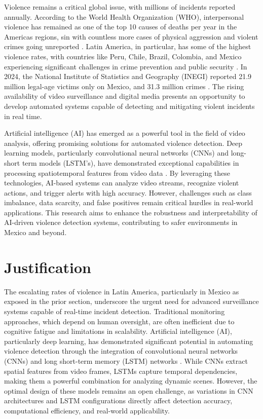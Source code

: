 


Violence remains a critical global issue, with millions of 
incidents reported annually. According to the World Health 
Organization (WHO), interpersonal violence has remained as one 
of the top 10 causes of deaths per year in the Americas regions, 
sin with countless more cases of physical aggression and violent 
crimes going unreported \cite{WorldHealthOrganization2024}. 
Latin America, in particular, has some of the highest violence rates, 
with countries like Peru, Chile, Brazil, Colombia, and Mexico experiencing 
significant challenges in crime prevention and public security 
\cite{Bisca2024}. In 2024, the National Institute of Statistics and 
Geography (INEGI) reported 21.9 million legal-age victims only on 
Mexico, and 31.3 million crimes \cite{INEGI2024}. The rising 
availability of video surveillance and digital media presents 
an opportunity to develop automated systems capable of detecting 
and mitigating violent incidents in real time.

Artificial intelligence (AI) has emerged as a powerful tool 
in the field of video analysis, offering promising solutions 
for automated violence detection. Deep learning models, 
particularly convolutional neural networks (CNNs) and 
long-short term models (LSTM's), have demonstrated 
exceptional capabilities in processing spatiotemporal 
features from video data \cite{Orozco2021}. By leveraging 
these technologies, AI-based systems can analyze video 
streams, recognize violent actions, and trigger alerts 
with high accuracy. However, challenges such as class 
imbalance, data scarcity, and false positives remain 
critical hurdles in real-world applications\cite{Kulkarni2021}. This 
research aims to enhance the robustness and interpretability 
of AI-driven violence detection systems, contributing to 
safer environments in Mexico and beyond.

\section{Justification}

The escalating rates of violence in Latin America, 
particularly in Mexico as exposed in the prior section, 
underscore the urgent need for advanced 
surveillance systems capable of real-time incident detection. 
Traditional monitoring approaches, which depend on human 
oversight, are often inefficient due to cognitive fatigue and 
limitations in scalability\cite{Marois2021}. Artificial intelligence (AI), 
particularly deep learning, has demonstrated significant 
potential in automating violence detection through the 
integration of convolutional neural networks (CNNs) and 
long short-term memory (LSTM) networks
\cite{Negre2024,Negre20242,Abdali2019,Sharma2021}. While CNNs extract 
spatial features from video frames, LSTMs capture temporal 
dependencies, making them a powerful combination for analyzing 
dynamic scenes. However, the optimal design of these models 
remains an open challenge, as variations in CNN architectures 
and LSTM configurations directly affect detection accuracy, 
computational efficiency, and real-world applicability.

